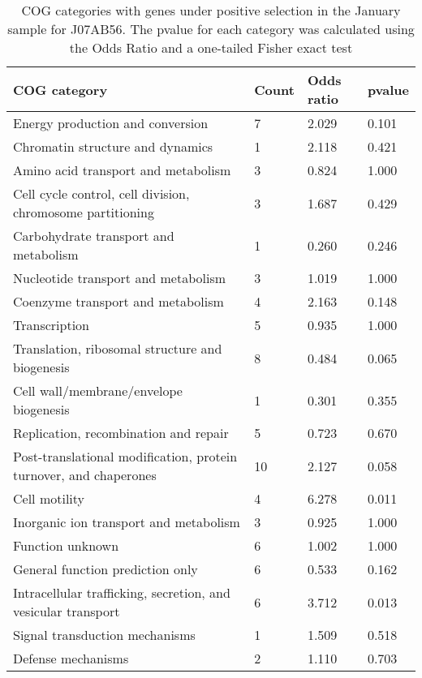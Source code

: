 \begin{table}[]
\footnotesize 
	\tabcolsep=0.11cm 
\caption{COG categories with genes under positive selection in the January sample for J07AB56. The pvalue for each category was calculated using the Odds Ratio and a one-tailed Fisher exact test} 
\begin{tabularx}{\textwidth}{L{6cm}R{2cm}R{2cm}R{2cm}} 
\hline 
\textbf{COG category} & \textbf{Count} & \textbf{Odds ratio} & \textbf{pvalue} \\ 
\hline 
Energy production and conversion & 7 & 2.029 & 0.101 \\ 
Chromatin structure and dynamics & 1 & 2.118 & 0.421 \\ 
Amino acid transport and metabolism & 3 & 0.824 & 1.000 \\ 
Cell cycle control, cell division, chromosome partitioning & 3 & 1.687 & 0.429 \\ 
Carbohydrate transport and metabolism & 1 & 0.260 & 0.246 \\ 
Nucleotide transport and metabolism & 3 & 1.019 & 1.000 \\ 
Coenzyme transport and metabolism & 4 & 2.163 & 0.148 \\ 
Transcription & 5 & 0.935 & 1.000 \\ 
Translation, ribosomal structure and biogenesis & 8 & 0.484 & 0.065 \\ 
Cell wall/membrane/envelope biogenesis & 1 & 0.301 & 0.355 \\ 
Replication, recombination and repair & 5 & 0.723 & 0.670 \\ 
Post-translational modification, protein turnover, and chaperones & 10 & 2.127 & 0.058 \\ 
Cell motility & 4 & 6.278 & 0.011 \\ 
Inorganic ion transport and metabolism & 3 & 0.925 & 1.000 \\ 
Function unknown & 6 & 1.002 & 1.000 \\ 
General function prediction only & 6 & 0.533 & 0.162 \\ 
Intracellular trafficking, secretion, and vesicular transport & 6 & 3.712 & 0.013 \\ 
Signal transduction mechanisms & 1 & 1.509 & 0.518 \\ 
Defense mechanisms & 2 & 1.110 & 0.703 \\ 
\end{tabularx} 
\label{January_COG_Selection_J07AB56} 
 \end{table} 

